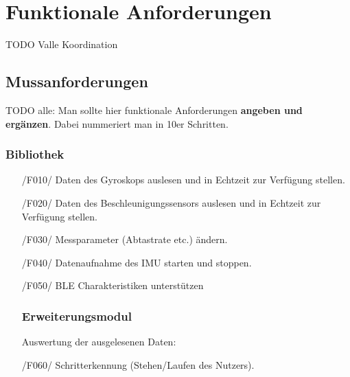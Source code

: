 \documentclass[a4paper,12pt]{article}
\begin{document}
\section{Funktionale Anforderungen}
TODO Valle Koordination

  \subsection{Mussanforderungen}
  TODO alle: Man sollte hier funktionale Anforderungen \textbf{angeben und ergänzen}. Dabei nummeriert man in 10er Schritten.
    \subsubsection{Bibliothek}
    \begin{itemize}
      \item[/F010/] Daten des Gyroskops auslesen und in Echtzeit zur Verfügung stellen.
      \item[/F020/] Daten des Beschleunigungssensors auslesen und in Echtzeit zur Verfügung stellen.
      \item[/F030/] Messparameter (Abtastrate etc.) ändern. %
      \item[/F040/] Datenaufnahme des IMU starten und stoppen.
      \item[/F050/] BLE Charakteristiken unterstützen %
    \subsubsection{Erweiterungsmodul}
     Auswertung der ausgelesenen Daten:
      \item[/F060/] Schritterkennung (Stehen/Laufen des Nutzers).

\end{itemize}
\end{document}
